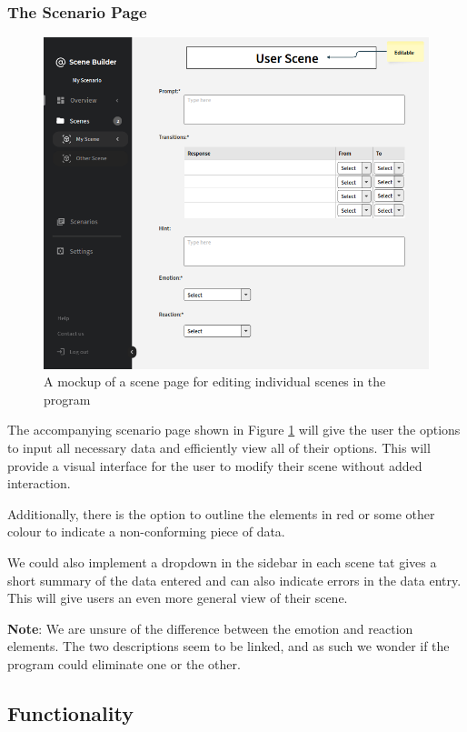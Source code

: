 \documentclass[sigart]{acmart_mod} %
\begin{document}
\subsubsection{The Scenario Page}
\begin{figure}
  \begin{center}
	\includegraphics[scale=0.4]{media/Scene_Page.png}
  \end{center}
\caption{A mockup of a scene page for editing individual scenes in the program}\label{fig2}
\end{figure}
The accompanying scenario page shown in Figure \ref{fig2} will give the user the options to input all necessary data and efficiently view all of their options. This will provide a visual interface for the user to modify their scene without added interaction.

Additionally, there is the option to outline the elements in red or some other colour to indicate a non-conforming piece of data.

We could also implement a dropdown in the sidebar in each scene tat gives a short summary of the data entered and can also indicate errors in the data entry. This will give users an even more general view of their scene.

\textbf{Note}: We are unsure of the difference between the emotion and reaction elements. The two descriptions seem to be linked, and as such we wonder if the program could eliminate one or the other.

\subsection{Functionality}
\end{document}
